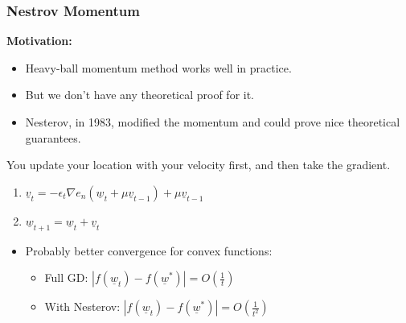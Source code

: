 \subsubsection{Nestrov Momentum}
\begin{intuition}
    \textbf{Motivation:} 

    \begin{itemize}
        \item Heavy-ball momentum method works well in practice.
        \item But we don’t have any theoretical proof for it.
        \item Nesterov, in 1983, modified the momentum and could prove nice theoretical guarantees.
    \end{itemize}
\end{intuition}
\begin{definition}
    You update your location with your velocity first, and then take the gradient.
    \begin{enumerate}
        \item $\underline{v}_t = -\epsilon_t \nabla e_n\left(\underline{w}_t + \mu \underline{v}_{t-1}\right) + \mu \underline{v}_{t-1}$
        \item $\underline{w}_{t+1} = \underline{w}_t + \underline{v}_t$
    \end{enumerate}
    
    \begin{itemize}
        \item Probably better convergence for convex functions:
        \begin{itemize}
            \item Full GD: \( |f(\underline{w}_t) - f(\underline{w}^*)| = O\left(\frac{1}{t}\right) \)
            \item With Nesterov: \( |f(\underline{w}_t) - f(\underline{w}^*)| = O\left(\frac{1}{t^2}\right) \)
        \end{itemize}
    \end{itemize}    
\end{definition}